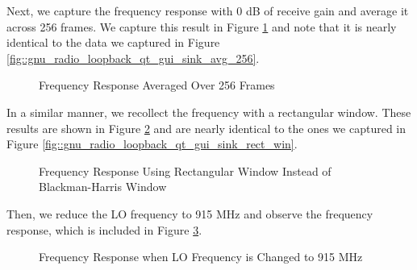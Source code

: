 \documentclass{article}
\begin{document}
Next, we capture the frequency response with 0 dB of receive gain and average it across 256 frames. We capture this result in Figure \ref{fig::gnu_radio_loopback_generic_iio_avg_256} and note that it is nearly identical to the data we captured in Figure \ref{fig::gnu_radio_loopback_qt_gui_sink_avg_256}.

\begin{figure}[H]
	\centerline{}
	\caption{Frequency Response Averaged Over 256 Frames}
	\label{fig::gnu_radio_loopback_generic_iio_avg_256}
\end{figure}

In a similar manner, we recollect the frequency with a rectangular window. These results are shown in Figure \ref{fig::gnu_radio_loopback_generic_iio_rect_win} and are nearly identical to the ones we captured in Figure \ref{fig::gnu_radio_loopback_qt_gui_sink_rect_win}.

\begin{figure}[H]
	\centerline{}
	\caption{Frequency Response Using Rectangular Window Instead of Blackman-Harris Window}
	\label{fig::gnu_radio_loopback_generic_iio_rect_win}
\end{figure}

Then, we reduce the LO frequency to 915 MHz and observe the frequency response, which is included in Figure \ref{fig::gnu_radio_loopback_generic_iio_915_MHz_lo}.

\begin{figure}[H]
	\centerline{}
	\caption{Frequency Response when LO Frequency is Changed to 915 MHz}
	\label{fig::gnu_radio_loopback_generic_iio_915_MHz_lo}
\end{figure}
\end{document}
